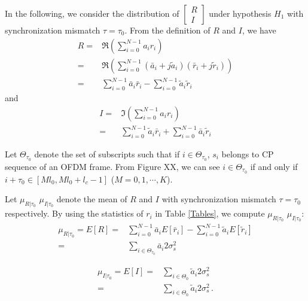 In the following, we consider the distribution of $\begin{bmatrix}
  R \\
  I
\end{bmatrix}$ under hypothesis $H_1$ with synchronization mismatch $\tau = \tau_0$.
From the definition of $R$ and $I$, we have 
\begin{equation}
  \begin{split}
	R = &\Re{(\sum_{i=0}^{N-1} a_ir_i)}\\
	= &\Re(\sum_{i=0}^{N-1}(\bar{a}_i+j\tilde{a}_i)(\bar{r}_i+j\tilde{r}_i))\\
	= &\sum_{i=0}^{N-1}\bar{a}_i\bar{r}_i - \sum_{i=0}^{N-1}\tilde{a}_i\tilde{r}_i
  \end{split}
  \label{R}
\end{equation}
and
\begin{equation}
  \begin{split}
	I = &\Im(\sum_{i=0}^{N-1} a_ir_i)\\
	= &\sum_{i=0}^{N-1}\tilde{a}_i\bar{r}_i + \sum_{i=0}^{N-1}\bar{a}_i\tilde{r}_i
  \end{split}
  \label{I}
\end{equation}

Let $\Theta_{\tau_0}$ denote the set of subscripts such that if $i \in \Theta_{\tau_0}$,  $s_i$ belongs to  CP sequence of an OFDM frame.
From Figure XX, we can see $i \in \Theta_{\tau_0}$ if and only if $i + \tau_0 \in [Ml_0, Ml_0+l_c -1]$ ($M = 0, 1, \cdots, K$). 

Let $\mu_{R|\tau_0}$ $\mu_{I|\tau_0}$ denote the mean of $R$ and $I$ with synchronization mismatch $\tau=\tau_0$ respectively. By using the statistics of $r_i$ in Table \ref{Tables}, we compute  $\mu_{R|\tau_0}$ $\mu_{I|\tau_0}$:
\begin{equation}
  \begin{split}
	\mu_{R|\tau_0} =  E[R] = &\sum_{i=0}^{N-1}\bar{a}_iE[\bar{r}_i] - \sum_{i=0}^{N-1}\tilde{a}_iE[\tilde{r}_i]\\
	= &\sum_{i\in\Theta_{\tau_0}}\bar{a}_i2\sigma_s^2
  \end{split}
  \label{ER}
\end{equation}

\begin{equation}
  \begin{split}
	\mu_{I|\tau_0} =  E[I] = &\sum_{i\in\Theta_0}\tilde{a}_i2\sigma_s^2\\
	= &\sum_{i\in\Theta_0}\tilde{a}_i2\sigma_s^2\,.
  \end{split}
  \label{EI}
\end{equation}

